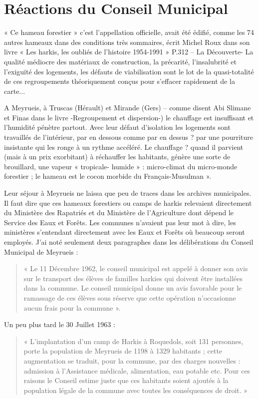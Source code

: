 \section{Réactions du Conseil Municipal}

« Ce hameau forestier » c’est l’appellation officielle, avait été édifié, comme les 74
autres hameaux dans des conditions très sommaires, écrit Michel Roux dans son livre
« Les harkis, les oubliés de l’histoire 1954-1991 » P.312 – La Découverte- La qualité médiocre
des matériaux de construction, la précarité, l’insalubrité et l’exiguïté des logements,
les défauts de viabilisation sont le lot de la quasi-totalité de ces regroupements
théoriquement conçus pour s’effacer rapidement de la carte...

A Meyrueis, à Truscas (Hérault) et Mirande (Gers) – comme disent Abi Slimane et Finas
dans le livre -Regroupement et dispersion-) le chauffage est insuffisant et l’humidité pénètre
partout. Avec leur défaut d’isolation les logements sont travaillés de l’intérieur, par
en dessous comme par en dessus ? par une pourriture insistante qui les ronge à un
rythme accéléré. Le chauffage ? quand il parvient (mais à un prix exorbitant) à
réchauffer les habitants, génère une sorte de brouillard, une vapeur « tropicale-
humide » : micro-climat du micro-monde forestier ; le hameau est le cocon morbide
du Français-Musulman ».

Leur séjour à Meyrueis ne laissa que peu de traces dans les archives municipales. Il
faut dire que ces hameaux forestiers ou camps de harkis relevaient directement du
Ministère des Rapatriés et du Ministère de l’Agriculture dont dépend le Service des
Eaux et Forêts. Les communes n’avaient pas leur mot à dire, les ministères
s’entendant directement avec les Eaux et Forêts où beaucoup seront employés. J’ai
noté seulement deux paragraphes dans les délibérations du Conseil Municipal de
Meyrueis :

\begin{quote}
« Le 11 Décembre 1962, le conseil municipal est appelé à donner son avis sur le
transport des élèves de familles harkies qui doivent être installées dans la commune.
Le conseil municipal donne un avis favorable pour le ramassage de ces élèves sous
réserve que cette opération n’occasionne aucun frais pour la commune ».
\end{quote}

Un peu plus tard le 30 Juillet 1963 :

\begin{quote}
« L’implantation d’un camp de Harkis à Roquedols, soit 131 personnes, porte la
population de Meyrueis de 1198 à 1329 habitants ; cette augmentation se traduit,
pour la commune, par des charges nouvelles : admission à l’Assistance médicale,
alimentation, eau potable etc. Pour ces raisons le Conseil estime juste que ces
habitants soient ajoutés à la population légale de la commune avec toutes les
conséquences de droit. »
\end{quote}

